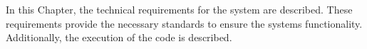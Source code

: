 \documentclass[../MasterThesis.tex]{subfiles}
\begin{document}


























In this Chapter, the technical requirements for the system are described. These requirements provide the necessary standards to ensure the systems functionality. Additionally, the execution of the code is described.




\end{document}

